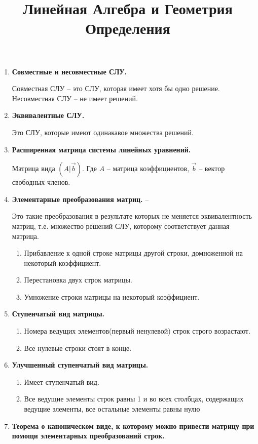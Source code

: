 

\title{Линейная Алгебра и Геометрия\\Определения}

\maketitle

\begin{enumerate}
\item \textbf{Совместные и несовместные СЛУ.} 

Совместная СЛУ -- это СЛУ, которая имеет хотя бы одно решение. \\
Несовместная СЛУ -- не имеет решений. 

\item \textbf{Эквивалентные СЛУ.} 

Это СЛУ, которые имеют одинакавое множества решений.

\item \textbf{Расширенная матрица системы линейных уравнений.} 
 
Матрица вида $(A | \vec b)$. Где $A$ -- матрица коэффициентов, $\vec b$ -- вектор свободных членов.

\item \textbf{Элементарные преобразования матриц.}  --

Это такие преобразования в результате которых не меняется эквивалентность матриц, т.е. множество решений СЛУ, которому соответствует данная матрица. 
\begin{enumerate}
	\item Прибавление к одной строке матрицы другой строки, домноженной на некоторый коэффициент.
	\item Перестановка двух строк матрицы.
	\item Умножение строки матрицы на некоторый коэффициент.
\end{enumerate}

\item \textbf{Ступенчатый вид матрицы.}
\begin{enumerate}
	\item Номера ведущих элементов(первый ненулевой) строк строго возрастают.
	\item Все нулевые строки стоят в конце.
\end{enumerate}

\item \textbf{Улучшенный ступенчатый вид матрицы.}

\begin{enumerate}
	\item Имеет ступенчатый вид.
	\item Все ведущие элементы строк равны 1 и во всех столбцах, содержащих ведущие элементы, все остальные элементы равны нулю
\end{enumerate}

\item \textbf{Теорема о каноническом виде, к которому можно привести матрицу при помощи элементарных преобразований строк.}

\end{enumerate}


